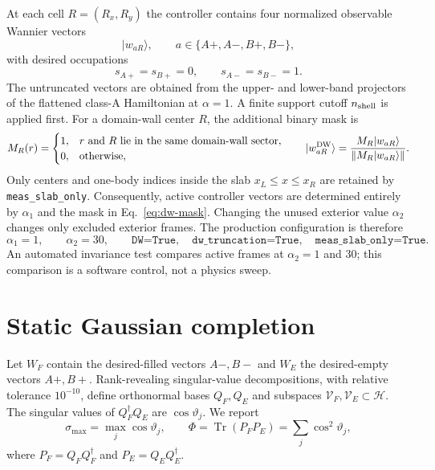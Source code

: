 \documentclass[aps,prb,onecolumn,nofootinbib,superscriptaddress]{revtex4-2}
\newcommand{\Tr}{\operatorname{Tr}}
\newcommand{\cH}{\mathcal{H}}
\newcommand{\cV}{\mathcal{V}}
\newcommand{\ket}[1]{\lvert #1\rangle}
\begin{document}
At each cell $R=(R_x,R_y)$ the controller contains four normalized observable
Wannier vectors
\begin{equation}
 \ket{w_{aR}},\qquad a\in\{A+,A-,B+,B-\},
\end{equation}
with desired occupations
\begin{equation}
 s_{A+}=s_{B+}=0,\qquad s_{A-}=s_{B-}=1.
 \label{eq:targets}
\end{equation}
The untruncated vectors are obtained from the upper- and lower-band projectors
of the flattened class-A Hamiltonian at $\alpha=1$.  A finite support cutoff
$n_{\rm shell}$ is applied first.  For a domain-wall center $R$, the additional
binary mask is
\begin{equation}
 M_R(r)=
 \begin{cases}
  1,&r\text{ and }R\text{ lie in the same domain-wall sector},\\
  0,&\text{otherwise},
 \end{cases}
 \qquad
 \ket{w^{\rm DW}_{aR}}=
 \frac{M_R\ket{w_{aR}}}{\lVert M_R\ket{w_{aR}}\rVert}.
 \label{eq:dw-mask}
\end{equation}
Only centers and one-body indices inside the slab $x_L\leq x\leq x_R$ are
retained by \texttt{meas\_slab\_only}.  Consequently, active controller vectors
are determined entirely by $\alpha_1$ and the mask in Eq.~\eqref{eq:dw-mask}.
Changing the unused exterior value $\alpha_2$ changes only excluded exterior
frames.  The production configuration is therefore
\begin{equation}
 \alpha_1=1,\qquad \alpha_2=30,\qquad
 \texttt{DW=True},\quad
 \texttt{dw\_truncation=True},\quad
 \texttt{meas\_slab\_only=True}.
 \label{eq:reference-geometry}
\end{equation}
An automated invariance test compares active frames at $\alpha_2=1$ and $30$;
this comparison is a software control, not a physics sweep.

\section{Static Gaussian completion}

Let $W_F$ contain the desired-filled vectors $A-,B-$ and $W_E$ the
desired-empty vectors $A+,B+$.  Rank-revealing singular-value decompositions,
with relative tolerance $10^{-10}$, define orthonormal bases $Q_F,Q_E$ and
subspaces $\cV_F,\cV_E\subset\cH$.  The singular values of
$Q_F^\dagger Q_E$ are $\cos\vartheta_j$.  We report
\begin{equation}
 \sigma_{\max}=\max_j\cos\vartheta_j,
 \qquad
 \Phi=\Tr(P_FP_E)=\sum_j\cos^2\vartheta_j,
 \label{eq:angles}
\end{equation}
where $P_F=Q_FQ_F^\dagger$ and $P_E=Q_EQ_E^\dagger$.
\end{document}
